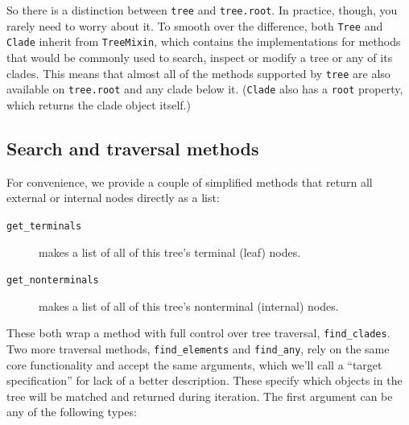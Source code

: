 \documentclass{report}
\begin{document}
So there is a distinction between \verb|tree| and \verb|tree.root|. In practice, though, you
rarely need to worry about it. To smooth over the difference, both \verb|Tree| and
\verb|Clade| inherit from \verb|TreeMixin|, which contains the implementations for methods
that would be commonly used to search, inspect or modify a tree or any of its clades. This
means that almost all of the methods supported by \verb|tree| are also available on
\verb|tree.root| and any clade below it. (\verb|Clade| also has a \verb|root| property, which
returns the clade object itself.)


\subsection{Search and traversal methods}

For convenience, we provide a couple of simplified methods that return all external or internal
nodes directly as a list:

\begin{description}
  \item[\texttt{get\_terminals}] makes a list of all of this tree's terminal (leaf) nodes.
  \item[\texttt{get\_nonterminals}] makes a list of all of this tree's nonterminal (internal)
    nodes.
\end{description}

These both wrap a method with full control over tree traversal, \verb|find_clades|. Two more
traversal methods, \verb|find_elements| and \verb|find_any|, rely on the same core
functionality and accept the same arguments, which we'll call a ``target specification'' for
lack of a better description. These specify which objects in the tree will be matched and
returned during iteration. The first argument can be any of the following types:
\end{document}
